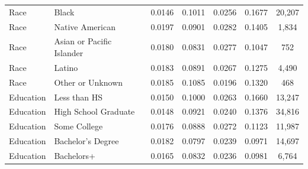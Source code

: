 \begin{tabular}{llccccc}
Race&Black&0.0146&0.1011&0.0256&0.1677&20,207\\
Race&Native American&0.0197&0.0901&0.0282&0.1405&1,834\\
Race&Asian or Pacific Islander&0.0180&0.0831&0.0277&0.1047&752\\
Race&Latino&0.0183&0.0891&0.0267&0.1275&4,490\\
Race&Other or Unknown&0.0185&0.1085&0.0196&0.1320&468\\
Education&Less than HS&0.0150&0.1000&0.0263&0.1660&13,247\\
Education&High School Graduate&0.0148&0.0921&0.0240&0.1376&34,816\\
Education&Some College&0.0176&0.0888&0.0272&0.1123&11,987\\
Education&Bachelor's Degree&0.0182&0.0797&0.0239&0.0971&14,697\\
Education&Bachelors+&0.0165&0.0832&0.0236&0.0981&6,764\\
\hline\hline
\end{tabular}
